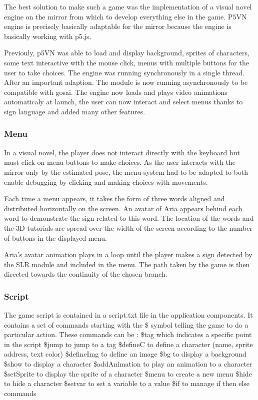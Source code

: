 The best solution to make such a game was the implementation of a visual novel engine on the mirror from which to develop everything else in the game. P5VN engine is precisely  basically adaptable for the mirror because the engine is basically working with p5.js.

Previouly, p5VN was able to load and display background, sprites of characters, some text interactive with the mouse click, menus with multiple buttons for the user to take choices.
The engine was running synchronously in a single thread.
After an important adaption. The module is now running asynchronously to be compatible with gosai. 
The engine now loads and plays video animations automaticaly at launch, the user can now interact and select menus thanks to sign language and added many other features.

\subsubsection{Menu}

In a visual novel, the player does not interact directly with the keyboard but must click on menu buttons to make choices. As the user interacts with the mirror only by the estimated pose, the menu system had to be adapted to both enable debugging by clicking and making choices with movements.

Each time a menu appears, it takes the form of three words aligned and distributed horizontally on the screen. An avatar of Aria appears behind each word to demonstrate the sign related to this word. The location of the words and the 3D tutorials are spread over the width of the screen according to the number of buttons in the displayed menu. 

Aria's avatar animation plays in a loop until the player makes a sign detected by the SLR module and included in the menu. The path taken by the game is then directed towards the continuity of the chosen branch.

\subsubsection{Script}

The game script is contained in a script.txt file in the application components. It contains a set of commands starting with the \$ symbol telling the game to do a particular action. These commands can be :
\$tag which indicates a specific point in the script
\$jump to jump to a tag
\$defineC to define a character (name, sprite address, text color)
\$defineImg to define an image
\$bg to display a background
\$show to display a character
\$addAnimation to play an animation to a character
\$setSprite to display the sprite of a character
\$menu to create a new menu
\$hide to hide a character
\$setvar to set a variable to a value
\$if to manage if then else commands

